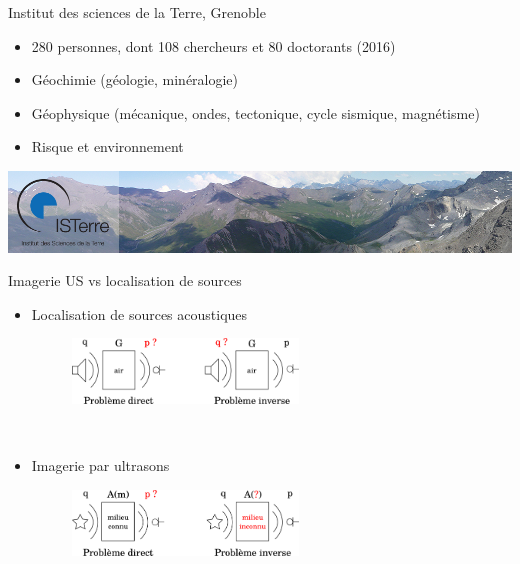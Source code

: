 \begin{frame}
	\titlepage 
\end{frame}

\begin{frame}{Institut des sciences de la Terre, Grenoble}
	\begin{itemize}
		\item 280 personnes, dont 108 chercheurs et 80 doctorants (2016)
		\item Géochimie (géologie, minéralogie)
		\item Géophysique (mécanique, ondes, tectonique, cycle sismique, magnétisme)
		\item Risque et environnement
	\end{itemize}
	
		
	\vfill
	\includegraphics[width=\textwidth]{img/bandeau_isterre.jpg}
\end{frame}

\begin{frame}{Imagerie US vs localisation de sources}
	\begin{itemize}
		\item<1-> Localisation de sources acoustiques
		\begin{figure}
			\includegraphics[width = 6cm]{./img/pd_dir_inv/ac.png}
		\end{figure}~\\
		\item<2-> Imagerie par ultrasons
		\begin{figure}
			\includegraphics[width = 6cm]{./img/pd_dir_inv/us.png}
		\end{figure}
	\end{itemize}
	
\end{frame}

